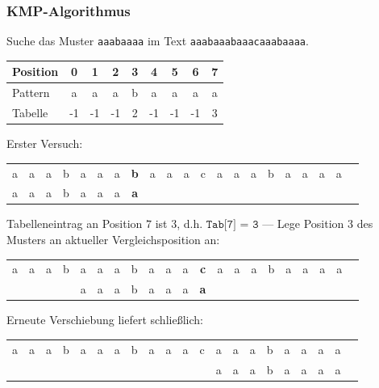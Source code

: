 \documentclass{beamer}
\begin{document}
\begin{frame} \frametitle{KMP-Algorithmus}
	\small
	Suche das Muster \texttt{aaabaaaa} im Text \texttt{aaabaaabaaacaaabaaaa}.
	\begin{center}
		\begin{tabular}{l|cccccccc}
			Position &  0 &  1 &  2 &  3 &  4 &  5 &  6 &  7 \\ \hline
			Pattern  &  a &  a &  a &  b &  a &  a &  a &  a \\ \hline
			Tabelle  & -1 & -1 & -1 &  2 & -1 & -1 & -1 &  3 \\
		\end{tabular}
	\end{center}

	\renewcommand*{\arraystretch}{.7}
	\setlength{\tabcolsep}{1pt}
	
	Erster Versuch:
	\begin{center}
		\begin{tabular}{ccccccccccccccccccccc}
			a & a & a & b & a & a & a & \textbf{b} & a & a & a & c & a & a & a & b & a & a & a & a \\
			a & a & a & b & a & a & a & \textbf{a}
		\end{tabular}
	\end{center}
	Tabelleneintrag an Position $7$ ist $3$, d.h. $\texttt{Tab[7] = 3}$ --- Lege Position $3$ des Musters an aktueller Vergleichsposition an:
	\begin{center}
		\begin{tabular}{ccccccccccccccccccccc}
			a & a & a & b & a & a & a & b & a & a & a & \textbf{c} & a & a & a & b & a & a & a & a \\
			&   &   &   & a & a & a & b & a & a & a & \textbf{a}
		\end{tabular}
	\end{center}
	Erneute Verschiebung liefert schließlich:
	\begin{center}
		\begin{tabular}{ccccccccccccccccccccc}
			a & a & a & b & a & a & a & b & a & a & a & c & a & a & a & b & a & a & a & a \\
			&   &   &   &   &   &   &   &   &   &   &   & a & a & a & b & a & a & a & a &
		\end{tabular}
	\end{center}
\end{frame}
\end{document}

